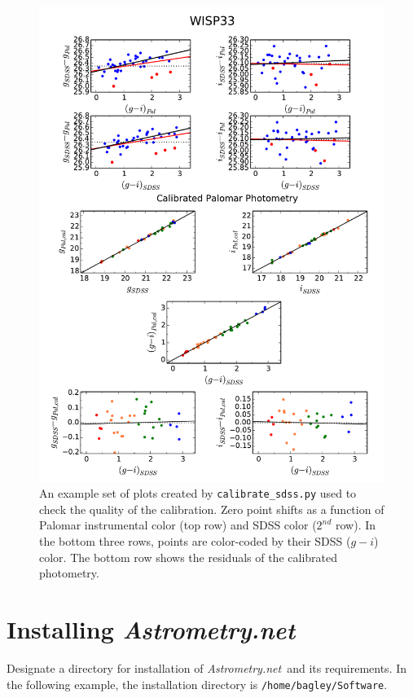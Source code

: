 \documentclass{article}
\newcommand{\An}{\textit{Astrometry.net}}
\begin{document}
\begin{figure}
\begin{center}
\includegraphics[scale=0.8]{sdss_calibration.pdf}
\caption{An example set of plots created by \texttt{calibrate\_sdss.py}
used to check the quality of the calibration. Zero point
shifts as a function of Palomar instrumental color (top row) and SDSS color 
($2^{nd}$ row). In the bottom three rows, points are color-coded by their
SDSS ($g-i$) color. The bottom row shows the residuals of the calibrated
photometry.
\label{fig:cals}
}
\end{center}
\end{figure}

\vspace{4 mm}
\appendix
\section{Installing \An}
Designate a directory for installation of \An~and its requirements.
In the following example, the installation directory is
\texttt{/home/bagley/Software}. \\
\end{document}
